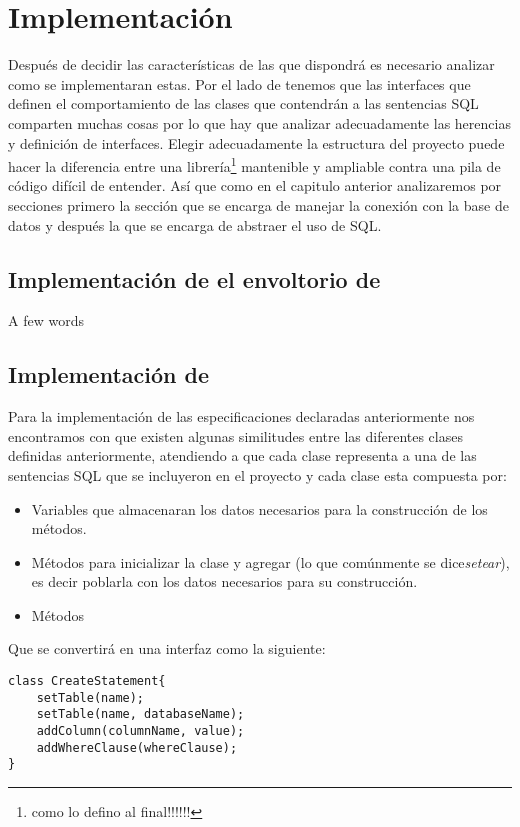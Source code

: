 \chapter{Implementación}
Después de decidir las características de las que dispondrá \jj es necesario analizar como se implementaran estas. Por el lado de \cc tenemos que las interfaces que definen el comportamiento de las clases que contendrán a las sentencias SQL comparten muchas cosas por lo que hay que analizar adecuadamente las herencias y definición de interfaces. Elegir adecuadamente la estructura del proyecto puede hacer la diferencia entre una librería\footnote{como lo defino al final!!!!!!} mantenible y ampliable contra una pila de código difícil de entender. Así que como en el capitulo anterior analizaremos \jj por secciones  primero la sección que se encarga de manejar la conexión con la base de datos y después la que se encarga de abstraer el uso de SQL.






\section{Implementación de el envoltorio de \jj}

A few words




\section{Implementación de \cc}

Para la implementación de las especificaciones declaradas anteriormente nos encontramos con que existen algunas similitudes entre las diferentes clases definidas anteriormente, atendiendo a que cada clase representa a una de las sentencias SQL que se incluyeron en el proyecto y cada clase esta compuesta por:
\begin{itemize}
\item Variables que almacenaran los datos necesarios para la construcción de los métodos.

\item Métodos para inicializar la clase y agregar (lo que comúnmente se dice\textit{setear}), es decir poblarla con los datos necesarios para su construcción.

\item Métodos


\end{itemize}


Que se convertirá en una interfaz como la siguiente:


\begin{lstlisting}[title=Pseudocódigo interfaz para CREATE]
class CreateStatement{
	setTable(name);
	setTable(name, databaseName);
	addColumn(columnName, value);
	addWhereClause(whereClause);
}
\end{lstlisting}
